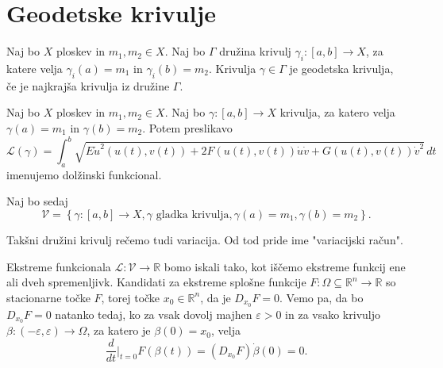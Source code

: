 \section{Geodetske krivulje}

\begin{definicija}
\label{def_geodetska_krivulja}
Naj bo $X$ ploskev in $m_1, m_2 \in X$. Naj bo $\Gamma$ družina krivulj $\gamma_i: [a,b] \to X$, za katere velja $\gamma_i(a) = m_1$ in $\gamma_i(b) = m_2$.
Krivulja $\gamma \in  \Gamma$ je geodetska krivulja, če je najkrajša krivulja iz družine $\Gamma$. 
\end{definicija}

\begin{definicija}
\label{def_dolzinski_funkcional}
Naj bo $X$ ploskev in $m_1, m_2 \in X$. Naj bo $\gamma: [a,b] \to  X$ krivulja, za katero velja $\gamma(a) = m_1$ in $\gamma(b) = m_2$. Potem preslikavo \begin{equation*}
\mathcal{L}(\gamma) = \int_{a}^{b} \sqrt{E \dot{u}^2(u(t), v(t)) + 2F(u(t), v(t)) \dot{u} \dot{v} + G(u(t), v(t)) \dot{v}^2}  \, dt 
\end{equation*}  
imenujemo dolžinski funkcional.
\end{definicija}

Naj bo sedaj \begin{equation*}
\mathcal{V} = \left\{ \gamma: [a,b] \to  X, \gamma \text{ gladka krivulja}, \gamma(a) = m_1, \gamma(b) = m_2 \right\}. 
\end{equation*}
\begin{opomba}
Takšni družini krivulj rečemo tudi variacija. Od tod pride ime "variacijski račun".
\end{opomba}
Ekstreme funkcionala $\mathcal{L}: \mathcal{V} \to  \mathbb{R}$ bomo iskali tako, kot iščemo ekstreme
funkcij ene ali dveh spremenljivk. Kandidati za ekstreme splošne funkcije $F: \Omega \subseteq \mathbb{R}^n \to  \mathbb{R}$ so stacionarne točke $F$, torej
točke $x_0 \in \mathbb{R}^n$, da je $D_{x_0}F = 0$. Vemo pa, da bo $D_{x_0}F = 0$ natanko tedaj, ko za vsak dovolj majhen $\varepsilon > 0$ in za vsako krivuljo
$\beta: (- \varepsilon, \varepsilon) \to  \Omega$, za katero je $\beta(0) = x_0$, velja \begin{equation*}
\frac{d}{dt}  \bigg|_{t = 0} F(\beta(t)) = (D_{x_0}F) \dot{\beta}(0) = 0. 
\end{equation*}  

